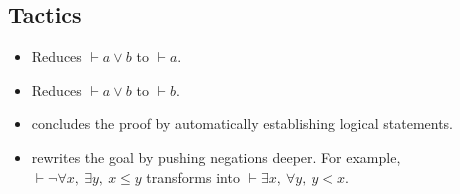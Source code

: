 \documentclass[a4paper]{article}
\begin{document}
\subsection*{Tactics}







\begin{itemize}
    \item Reduces $\vdash a \vee b$ to $\vdash a$.
\end{itemize}


\begin{itemize}
    \item Reduces $\vdash a \vee b$ to $\vdash b$.
\end{itemize}


\begin{itemize}
    \item \tauto concludes the proof by automatically establishing logical statements.
\end{itemize}


\begin{itemize}
    \item \pushneg rewrites the goal by pushing negations deeper.
    For example,
    $\vdash \neg \forall x,\ \exists y,\ x \leq y$
    transforms into
    $\vdash \exists x,\ \forall y,\ y < x$.
\end{itemize}

\end{document}
